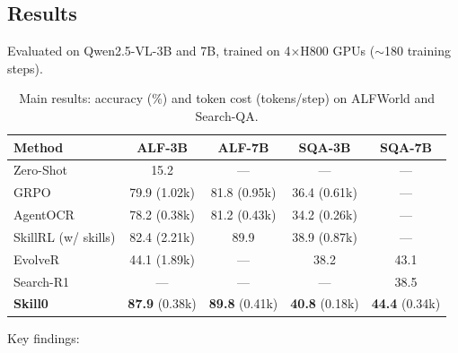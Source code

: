 \documentclass[11pt]{article}
\begin{document}
\subsection{Results}

Evaluated on Qwen2.5-VL-3B and 7B, trained on 4$\times$H800 GPUs ($\sim$180 training steps).

\begin{table}[h]
\centering
\caption{Main results: accuracy (\%) and token cost (tokens/step) on ALFWorld and Search-QA.}
\begin{tabular}{lcccc}
\toprule
\textbf{Method} & \textbf{ALF-3B} & \textbf{ALF-7B} & \textbf{SQA-3B} & \textbf{SQA-7B} \\
\midrule
Zero-Shot & 15.2 & --- & --- & --- \\
GRPO & 79.9 (1.02k) & 81.8 (0.95k) & 36.4 (0.61k) & --- \\
AgentOCR & 78.2 (0.38k) & 81.2 (0.43k) & 34.2 (0.26k) & --- \\
SkillRL (w/ skills) & 82.4 (2.21k) & 89.9 & 38.9 (0.87k) & --- \\
EvolveR & 44.1 (1.89k) & --- & 38.2 & 43.1 \\
Search-R1 & --- & --- & --- & 38.5 \\
\textbf{Skill0} & \textbf{87.9} (0.38k) & \textbf{89.8} (0.41k) & \textbf{40.8} (0.18k) & \textbf{44.4} (0.34k) \\
\bottomrule
\end{tabular}
\end{table}

Key findings:
\end{document}
